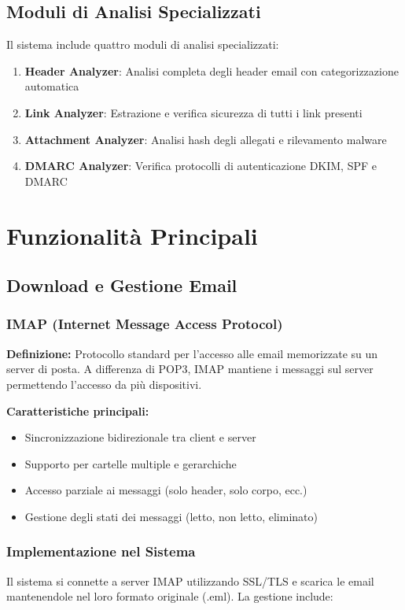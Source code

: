 \documentclass{article}
\begin{document}
\subsection{Moduli di Analisi Specializzati}

Il sistema include quattro moduli di analisi specializzati:

\begin{enumerate}
    \item \textbf{Header Analyzer}: Analisi completa degli header email con categorizzazione automatica
    \item \textbf{Link Analyzer}: Estrazione e verifica sicurezza di tutti i link presenti
    \item \textbf{Attachment Analyzer}: Analisi hash degli allegati e rilevamento malware
    \item \textbf{DMARC Analyzer}: Verifica protocolli di autenticazione DKIM, SPF e DMARC
\end{enumerate}

\section{Funzionalità Principali}

\subsection{Download e Gestione Email}

\subsubsection{IMAP (Internet Message Access Protocol)}
\textbf{Definizione:} Protocollo standard per l'accesso alle email memorizzate su un server di posta. A differenza di POP3, IMAP mantiene i messaggi sul server permettendo l'accesso da più dispositivi.

\textbf{Caratteristiche principali:}
\begin{itemize}
    \item Sincronizzazione bidirezionale tra client e server
    \item Supporto per cartelle multiple e gerarchiche
    \item Accesso parziale ai messaggi (solo header, solo corpo, ecc.)
    \item Gestione degli stati dei messaggi (letto, non letto, eliminato)
\end{itemize}

\subsubsection{Implementazione nel Sistema}
Il sistema si connette a server IMAP utilizzando SSL/TLS e scarica le email mantenendole nel loro formato originale (.eml). La gestione include:
\end{document}

